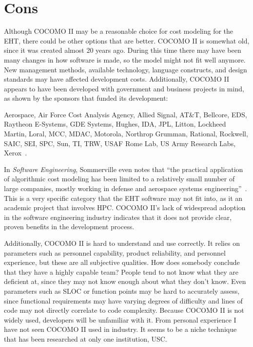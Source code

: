 \documentclass[letterpaper,twocolumn,10pt]{article}
\begin{document}
\section{Cons}

Although COCOMO II may be a reasonable choice for cost modeling for the EHT, there could be other options that are better. COCOMO II is somewhat old,
since it was created almost 20 years ago. During this time there may have been many changes in how software is made, so the model might not fit well anymore.
New management methods, available technology, language constructs, and design standards may have affected development costs. Additionally, COCOMO II
appears to have been developed with government and business projects in mind, as shown by the sponsors that funded its development:
\begin{displayquote}
Aerospace, Air Force
Cost Analysis Agency, Allied Signal, AT\&T, Bellcore, EDS, Raytheon E-Systems, GDE Systems, Hughes, IDA, JPL, Litton,
Lockheed Martin, Loral, MCC, MDAC, Motorola, Northrop Grumman, Rational, Rockwell, SAIC, SEI, SPC, Sun, TI, TRW,
USAF Rome Lab, US Army Research Labs, Xerox~\cite{COCOMO}.
\end{displayquote}
In \textit{Software Engineering}, Sommerville even notes that ``the practical application of algorithmic cost modeling
has been limited to a relatively small number of large companies, mostly working in
defense and aerospace systems engineering''~\cite{Sommerville}. This is a very specific category that the EHT software may not fit into,
as it an academic project that involves HPC. COCOMO II's lack of widespread adoption in the software engineering industry indicates that it does
not provide clear, proven benefits in the development process.

Additionally, COCOMO II is hard to understand and use correctly. It relies on parameters such as personnel capability, product reliability, and
personnel experience, but these are all subjective qualities. How does somebody conclude that they have a highly capable team? People tend to not know
what they are deficient at, since they may not know enough about what they don't know. Even parameters such as SLOC or function points may be hard to accurately
assess, since functional requirements may have varying degrees of difficulty and lines of code may not directly correlate to code complexity.
Because COCOMO II is not widely used, developers will be unfamiliar with it. From personal experience I have not seen COCOMO II used in
industry. It seems to be a niche technique that has been researched at only one institution, USC.
\end{document}
